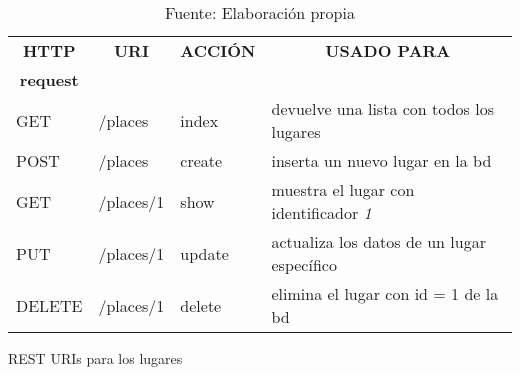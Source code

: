   \begin{table}[H]
    \begin{center}

      \begin{tabularx}{0.75\textwidth}{ l l l  X }
        \toprule
        \multicolumn{1}{c}{\textbf{HTTP}} &
        \multicolumn{1}{c}{\textbf{URI}}  &
        \multicolumn{1}{c}{\textbf{ACCI\'ON}} &
        \multicolumn{1}{c}{\textbf{USADO PARA}}  \\
        \multicolumn{1}{c}{\textbf{request}} & & & \\

        \midrule
        GET     &  /places    &  index    & devuelve una lista con todos los lugares\\
        POST    &  /places    &  create   & inserta un nuevo lugar en la bd\\
        GET     &  /places/1  &  show     & muestra el lugar con identificador \emph{1}\\
        PUT     &  /places/1  &  update   & actualiza los datos de un lugar específico\\
        DELETE  &  /places/1  &  delete   & elimina el lugar con id = 1 de la bd\\
        \bottomrule
      \end{tabularx}

      \caption[recursos REST]{REST URIs para los lugares}
      \label{tab:rest}

      \caption*{Fuente: Elaboración propia}
    \end{center}
  \end{table}




